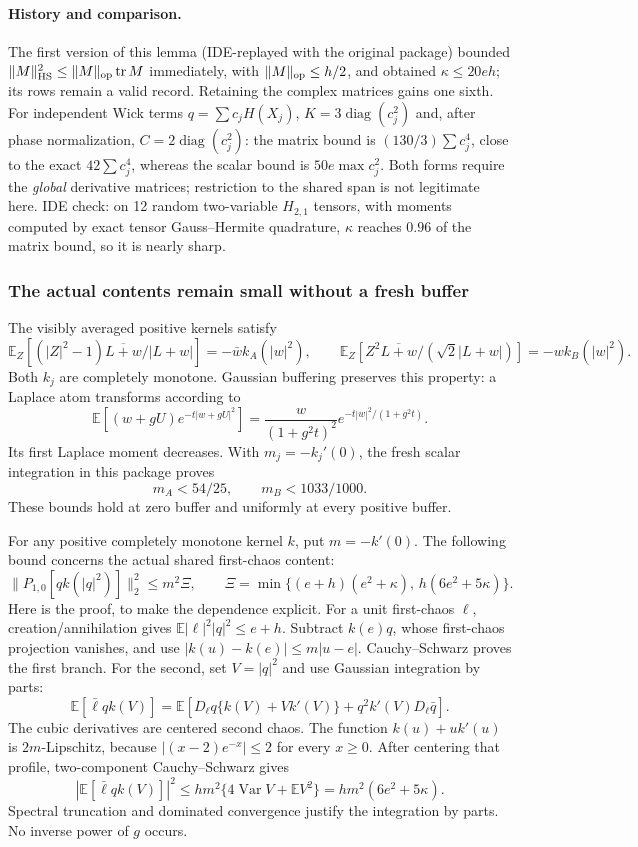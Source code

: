\paragraph{History and comparison.} The first version of this lemma
(IDE-replayed with the original package) bounded \(\|M\|_{\rm HS}^2\le
\|M\|_{\rm op}\operatorname{tr}M\) immediately, with \(\|M\|_{\rm op}\le h/2\),
and obtained \(\kappa\le20eh\); its rows remain a valid record. Retaining
the complex matrices gains one sixth. For independent Wick terms
\(q=\sum c_jH(X_j)\), \(K=3\operatorname{diag}(c_j^2)\) and, after phase
normalization, \(C=2\operatorname{diag}(c_j^2)\): the matrix bound is
\((130/3)\sum c_j^4\), close to the exact \(42\sum c_j^4\), whereas the
scalar bound is \(50e\max c_j^2\). Both forms require the \emph{global}
derivative matrices; restriction to the shared span is not legitimate here.
IDE check: on 12 random two-variable \(H_{2,1}\) tensors, with moments
computed by exact tensor Gauss--Hermite quadrature, \(\kappa\) reaches
\(0.96\) of the matrix bound, so it is nearly sharp.



\subsubsection{The actual contents remain small without a fresh buffer}
The visibly averaged positive kernels satisfy
\[
 \mathbb E_Z[(|Z|^2-1)\overline{L+w}/|L+w|]
       =-\bar w k_A(|w|^2),\qquad
 \mathbb E_Z[Z^2\overline{L+w}/(\sqrt2|L+w|)]
       =-w k_B(|w|^2).
\]
Both \(k_j\) are completely monotone. Gaussian buffering preserves
this property: a Laplace atom transforms according to
\[
 \mathbb E[(w+gU)e^{-t|w+gU|^2}]
 =\frac{w}{(1+g^2t)^2}
          e^{-t|w|^2/(1+g^2t)}.
\]
Its first Laplace moment decreases. With \(m_j=-k_j'(0)\), the
fresh scalar integration in this package proves
\[
 m_A<54/25,\qquad m_B<1033/1000. \tag{SB.7}
\]
These bounds hold at zero buffer and uniformly at every positive buffer.

For any positive completely monotone kernel \(k\), put \(m=-k'(0)\).
The following bound concerns the actual shared first-chaos content:
\[
 \|P_{1,0}[qk(|q|^2)]\|_2^2\le m^2\Xi,\qquad
 \Xi=\min\{(e+h)(e^2+\kappa),\,h(6e^2+5\kappa)\}. \tag{SB.8}
\]
Here is the proof, to make the dependence explicit.
For a unit first-chaos \(\ell\), creation/annihilation gives
\(\mathbb E|\ell|^2|q|^2\le e+h\).
Subtract \(k(e)q\), whose first-chaos projection vanishes, and use
\(|k(u)-k(e)|\le m|u-e|\). Cauchy--Schwarz proves the first branch.
For the second, set \(V=|q|^2\) and use Gaussian integration by parts:
\[
 \mathbb E[\bar\ell qk(V)]
 =\mathbb E[D_\ell q\{k(V)+Vk'(V)\}
                +q^2k'(V)D_\ell\bar q].
\]
The cubic derivatives are centered second chaos.
The function \(k(u)+uk'(u)\) is \(2m\)-Lipschitz, because
\(|(x-2)e^{-x}|\le2\) for every \(x\ge0\).
After centering that profile, two-component Cauchy--Schwarz gives
\[
 |\mathbb E[\bar\ell qk(V)]|^2
 \le h m^2\{4\operatorname{Var}V+\mathbb EV^2\}
 =h m^2(6e^2+5\kappa).
\]
Spectral truncation and dominated convergence justify the integration
by parts. No inverse power of \(g\) occurs.

